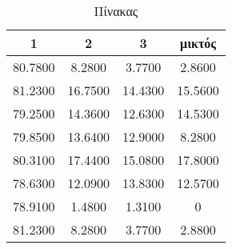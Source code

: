 \begin{table}
\centering
\begin{tabular}{ |c|c|c|c|  }
\hline
1 & 2 & 3 & μικτός\\
\hline

   80.7800   & 8.2800 &   3.7700 &   2.8600\\
   \hline
   81.2300   &16.7500 &  14.4300 &  15.5600\\
\hline   
   79.2500   &14.3600 &  12.6300 &  14.5300\\
\hline
   79.8500   &13.6400 &  12.9000 &   8.2800\\
\hline   
   80.3100   &17.4400 &  15.0800 & 17.8000\\
   \hline
   78.6300   &12.0900 &  13.8300 &  12.5700\\
\hline   
   78.9100   & 1.4800 &   1.3100 &        0\\
\hline   
   81.2300   & 8.2800 &   3.7700 &   2.8800\\
\hline   
   \end{tabular}
\caption{Πίνακας  }
\label{tab:F1scoretypes}
\end{table}